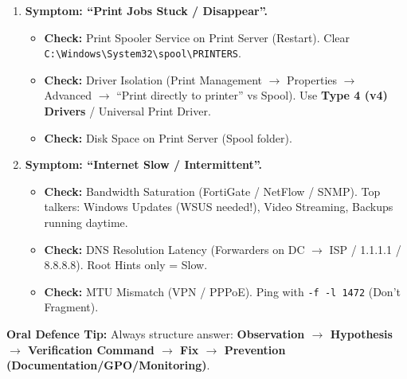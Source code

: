 \documentclass[11pt]{article}
\begin{document}
\begin{methode}
\begin{enumerate}
\begin{itemize}
        \item \textbf{Check:} Disk Queue Length (PerfMon: \texttt{PhysicalDisk\% Idle Time}, \texttt{Avg. Disk sec/Read}). RAID rebuild running? AV scanning live data? Exclude data volume from Real-time AV.
        \item \textbf{Check:} Opportunistic Locking (OpLocks) / SMB2/3 credits. Update NIC drivers / Firmware.
    \end{itemize}
    \item \textbf{Symptom: ``Print Jobs Stuck / Disappear''.}
\begin{itemize}
        \item \textbf{Check:} Print Spooler Service on Print Server (Restart). Clear \texttt{C:\textbackslash{}Windows\textbackslash{}System32\textbackslash{}spool\textbackslash{}PRINTERS}.
        \item \textbf{Check:} Driver Isolation (Print Management $\rightarrow$ Properties $\rightarrow$ Advanced $\rightarrow$ ``Print directly to printer'' vs Spool). Use \textbf{Type 4 (v4) Drivers} / Universal Print Driver.
        \item \textbf{Check:} Disk Space on Print Server (Spool folder).
    \end{itemize}
    \item \textbf{Symptom: ``Internet Slow / Intermittent''.}
    \begin{itemize}
        \item \textbf{Check:} Bandwidth Saturation (FortiGate / NetFlow / SNMP). Top talkers: Windows Updates (WSUS needed!), Video Streaming, Backups running daytime.
        \item \textbf{Check:} DNS Resolution Latency (Forwarders on DC $\rightarrow$ ISP / 1.1.1.1 / 8.8.8.8). Root Hints only = Slow.
        \item \textbf{Check:} MTU Mismatch (VPN / PPPoE). Ping with \texttt{-f -l 1472} (Don't Fragment).
    \end{itemize}
\end{enumerate}
\textbf{Oral Defence Tip:} Always structure answer: \textbf{Observation $\rightarrow$ Hypothesis $\rightarrow$ Verification Command $\rightarrow$ Fix $\rightarrow$ Prevention (Documentation/GPO/Monitoring)}.
\end{methode}
\end{document}
